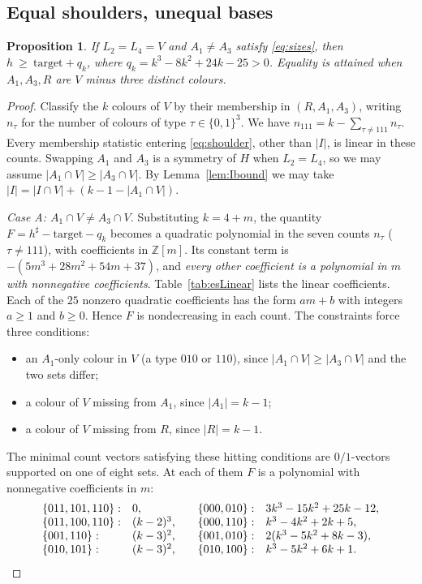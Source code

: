 \documentclass[11pt]{amsart}
\newtheorem{proposition}[theorem]{Proposition}
\theoremstyle{definition}
\theoremstyle{remark}
\newcommand{\1}{\mathbf 1}
\begin{document}
\subsection{Equal shoulders, unequal bases}
\begin{proposition}\label{prop:es}
If $L_2=L_4=V$ and $A_1\ne A_3$ satisfy \eqref{eq:sizes}, then
$h\ \ge\ \mathrm{target}+q_k$, where $q_k=k^3-8k^2+24k-25>0$.
Equality is attained when $A_1,A_3,R$ are $V$ minus three distinct colours.
\end{proposition}

\begin{proof}
Classify the $k$ colours of $V$ by their membership in $(R,A_1,A_3)$, writing $n_{\tau}$ for the number
of colours of type $\tau\in\{0,1\}^3$. We have $n_{111}=k-\sum_{\tau\neq111}n_\tau$. Every membership statistic entering
\eqref{eq:shoulder}, other than $|I|$, is linear in these counts. Swapping $A_1$ and $A_3$ is a symmetry
of $H$ when $L_2=L_4$, so we may assume $|A_1\cap V|\ge|A_3\cap V|$. By Lemma~\ref{lem:Ibound} we may
take $|I|=|I\cap V|+(k-1-|A_1\cap V|)$.

\emph{Case A: $A_1\cap V\ne A_3\cap V$.}
Substituting $k=4+m$, the quantity $F=h^\sharp-\mathrm{target}-q_k$ becomes a quadratic polynomial in
the seven counts $n_\tau$ ($\tau\ne111$), with coefficients in $\mathbb Z[m]$. Its constant term is
$-(5m^3+28m^2+54m+37)$, and \emph{every other coefficient is a polynomial in $m$ with nonnegative
coefficients}. Table~\ref{tab:esLinear} lists the linear coefficients. Each of the $25$ nonzero quadratic
coefficients has the form $am+b$ with integers $a\ge1$ and $b\ge0$. Hence $F$ is nondecreasing in each count. The constraints force three
conditions:
\begin{itemize}
\item an $A_1$-only colour in $V$ (a type $010$ or $110$), since $|A_1\cap V|\ge|A_3\cap V|$ and the
  two sets differ;
\item a colour of $V$ missing from $A_1$, since $|A_1|=k-1$;
\item a colour of $V$ missing from $R$, since $|R|=k-1$.
\end{itemize}
The minimal count vectors satisfying these hitting conditions are $0/1$-vectors supported on one of
eight sets. At each of them $F$ is a polynomial with nonnegative coefficients in $m$:
\[
\begin{array}{ll@{\qquad}ll}
\{011,101,110\}: & 0, & \{000,010\}: & 3k^3-15k^2+25k-12,\\
\{011,100,110\}: & (k-2)^3, & \{000,110\}: & k^3-4k^2+2k+5,\\
\{001,110\}: & (k-3)^2, & \{001,010\}: & 2(k^3-5k^2+8k-3),\\
\{010,101\}: & (k-3)^2, & \{010,100\}: & k^3-5k^2+6k+1.
\end{array}
\]


\end{proof}
\end{document}
